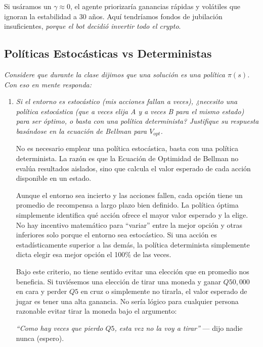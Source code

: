 \documentclass[11pt]{article}
\begin{document}
\vspace{0.5em}

\noindent Si usáramos un $\gamma \approx 0$, el agente priorizaría ganancias rápidas y volátiles que ignoran la estabilidad a 30
años. Aquí tendríamos fondos de jubilación insuficientes, \textit{porque el bot decidió invertir todo el crypto}.

\subsection*{Políticas Estocásticas vs Deterministas}
\noindent\textit{Considere que durante la clase dijimos que una solución es una política $\pi(s)$. Con eso en mente responda:}

\begin{enumerate}
  \item\textit{Si el entorno es estocástico (mis acciones fallan a veces), ¿necesito una política estocástica (que a veces elija A y a veces B para el mismo estado) para ser óptimo, o basta con una política determinista? Justifique su respuesta basándose en la ecuación de Bellman para $V_{opt}$.}

  No es necesario emplear una política estocástica, basta con una política determinista. La razón es que la
  Ecuación de Optimidad de Bellman no evalúa resultados aislados, sino que calcula el valor esperado de cada acción disponible en
  un estado. 

  Aunque el entorno sea incierto y las acciones fallen, cada opción tiene un promedio de recompensa a largo plazo bien definido.
  La política óptima simplemente identifica qué acción ofrece el mayor valor esperado y la elige. No hay
  incentivo matemático para ``variar'' entre la mejor opción y otras inferiores solo porque el entorno sea estocástico. Si una acción
  es estadísticamente superior a las demás, la política determinista simplemente dicta elegir esa mejor opción el 100\% de las
  veces.

  Bajo este criterio, no tiene sentido evitar una elección que en promedio nos beneficia. Si tuviésemos una elección de tirar una
  moneda y ganar $Q50,000$ en cara y perder $Q5$ en cruz o simplemente no tirarla, el valor esperado de jugar es tener una alta
  ganancia. No sería lógico para cualquier persona razonable evitar tirar la moneda bajo el argumento:

  \begin{center}
  \textit{``Como hay veces que pierdo $Q5$, esta vez no la voy a tirar''} --- dijo nadie nunca (espero).
  \end{center}
\end{enumerate}
\end{document}
